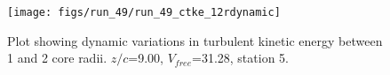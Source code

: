 \begin{figure}[H]
\centering
\texttt{[image: figs/run\_49/run\_49\_ctke\_12rdynamic]}
\caption{Plot showing dynamic variations in turbulent kinetic energy between 1 and 2 core radii. $z/c$=9.00, $V_{free}$=31.28, station 5.}
\end{figure}


